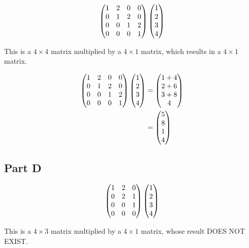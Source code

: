 \[
\genericmat{p}{1&2&0&0\\0&1&2&0\\0&0&1&2\\0&0&0&1} \genericmat{p}{1\\2\\3\\4}
\]

This is a $4 \times 4$ matrix multiplied by a $4 \times 1$ matrix, which results in a $4 \times 1$ matrix.

\[
	\begin{aligned}
		\genericmat{p}{1&2&0&0\\0&1&2&0\\0&0&1&2\\0&0&0&1} \genericmat{p}{1\\2\\3\\4}
		&= \genericmat{p}{1+4 \\ 2 + 6 \\ 3+8 \\ 4} \\
		&= \genericmat{p}{5\\8\\1\\4}
	\end{aligned}
\]

\subsection*{Part D}

\[
	\genericmat{p}{1&2&0\\0&2&1\\0&0&1\\0&0&0} \genericmat{p}{1\\2\\3\\4}
\]

This is a $4 \times 3$ matrix multiplied by a $4 \times 1$ matrix, whose result DOES NOT EXIST.
